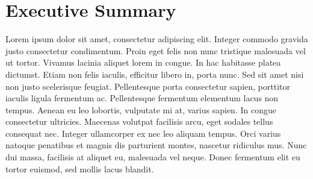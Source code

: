 \documentclass[
  letterpaper,
  oneside,
  open=any]{scrbook}
\renewcommand*\contentsname{Table of contents}
\newcommand\contentsname{Table of contents}
\begin{document}
\begin{frontmatter}
\begin{titlepage}
\begin{minipage}[b][\textheight][s]{\minipagewidth}
\titleblock

\authorblock

\affiliationblock

\vfill

\logoblock

\footerblock
\par

\end{minipage}
\clearpage
\restoregeometry
\end{titlepage}
\setcounter{page}{1}
\end{frontmatter}


\renewcommand*\contentsname{Table of contents}
{
\setcounter{tocdepth}{1}
\tableofcontents
}
\listoffigures
\listoftables
\mainmatter
{}

\hypertarget{executive-summary}{%
\chapter*{Executive Summary}\label{executive-summary}}


Lorem ipsum dolor sit amet, consectetur adipiscing elit. Integer commodo
gravida justo consectetur condimentum. Proin eget felis non nunc
tristique malesuada vel ut tortor. Vivamus lacinia aliquet lorem in
congue. In hac habitasse platea dictumst. Etiam non felis iaculis,
efficitur libero in, porta nunc. Sed sit amet nisi non justo scelerisque
feugiat. Pellentesque porta consectetur sapien, porttitor iaculis ligula
fermentum ac. Pellentesque fermentum elementum lacus non tempus. Aenean
eu leo lobortis, vulputate mi at, varius sapien. In congue consectetur
ultricies. Maecenas volutpat facilisis arcu, eget sodales tellus
consequat nec. Integer ullamcorper ex nec leo aliquam tempus. Orci
varius natoque penatibus et magnis dis parturient montes, nascetur
ridiculus mus. Nunc dui massa, facilisis at aliquet eu, malesuada vel
neque. Donec fermentum elit eu tortor euismod, sed mollis lacus blandit.
\end{document}

